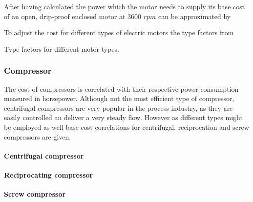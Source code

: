 			After having calculated the power which the motor needs to supply its base cost of an open,
			drip-proof enclosed motor at 3600 $rpm$ can be approximated by
			
			To adjust the cost for different types of electric motors the type factors from 
			
            \begin{table}
                \footnotesize
                \center
                
                \caption{Type factors for different motor types.}
                \label{tab:pump:MotorTypes}
	        \end{table}

	\subsubsection{Compressor}
		The cost of compressors is correlated with their respective power consumption measured in horsepower.
		Although not the most efficient type of compressor, centrifugal compressors are very popular in the
		process industry, as they are easily controlled an deliver a very steady flow. However as different
		types might be employed as well base cost correlations for centrifugal, reciprocation and screw
		compressors are given.
		
			\paragraph{Centrifugal compressor}
			
			\paragraph{Reciprocating compressor}
				
			\paragraph{Screw compressor}
		
